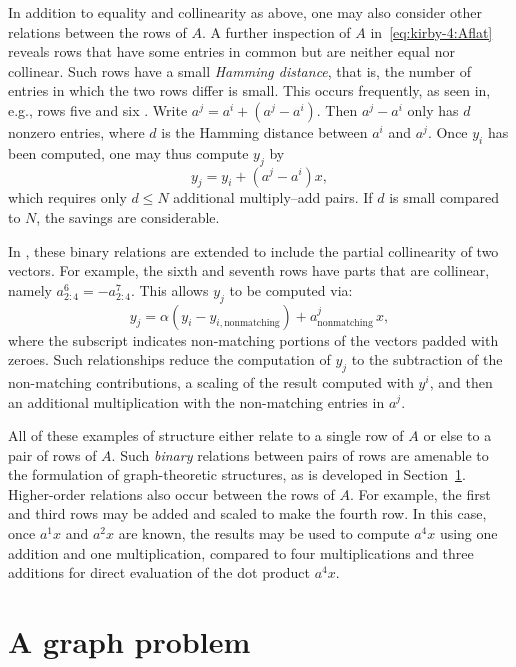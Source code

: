 In addition to equality and collinearity as above, one may also
consider other relations between the rows of $A$. A further inspection
of $A$ in~\eqref{eq:kirby-4:Aflat} reveals rows that have some entries
in common but are neither equal nor collinear. Such rows have a small
\emph{Hamming distance}, that is, the number of entries in which the
two rows differ is small. This occurs frequently, as seen in, e.g.,
rows five and six . Write $ a^j = a^i + (a^j-a^i) $. Then $ a^j -a^i $
only has $ d $ nonzero entries, where $d$ is the Hamming distance
between $a^i$ and $a^j$.  Once $ y_i $ has been computed, one may thus
compute $y_j$ by
\begin{equation}
y_j = y_i + \left( a^j - a^i \right) x,
\end{equation}
which requires only $ d \leqslant N $ additional multiply--add pairs. If
$ d $ is small compared to $ N $, the savings are considerable.

In \citet{WolfHeath2009}, these binary relations are extended to
include the partial collinearity of two vectors.  For example, the
sixth and seventh rows have parts that are collinear, namely
$a^6_{2:4} = - a^7_{2:4}$.  This allows $y_j$ to be computed via:
\begin{equation}
  y_j = \alpha(y_i - y_{i,\mathrm{nonmatching}}) + a^j_{\mathrm{nonmatching}} \, x,
\end{equation}
where the subscript indicates non-matching portions of the vectors
padded with zeroes. Such relationships reduce the computation of $y_j$
to the subtraction of the non-matching contributions, a scaling of the
result computed with $y^i$, and then an additional multiplication with
the non-matching entries in $a^j$.

All of these examples of structure either relate to a single row of $
A $ or else to a pair of rows of $ A $. Such \emph{binary} relations
between pairs of rows are amenable to the formulation of
graph-theoretic structures, as is developed in
Section~\ref{sec:kirby-4:graph}. Higher-order relations also occur
between the rows of $ A $.  For example, the first and third rows may
be added and scaled to make the fourth row.  In this case, once $ a^1
x $ and $ a^2 x $ are known, the results may be used to compute $
a^{4} x $ using one addition and one multiplication, compared to four
multiplications and three additions for direct evaluation of the dot
product $a^{4} x$.

\section{A graph problem}
\label{sec:kirby-4:graph}

